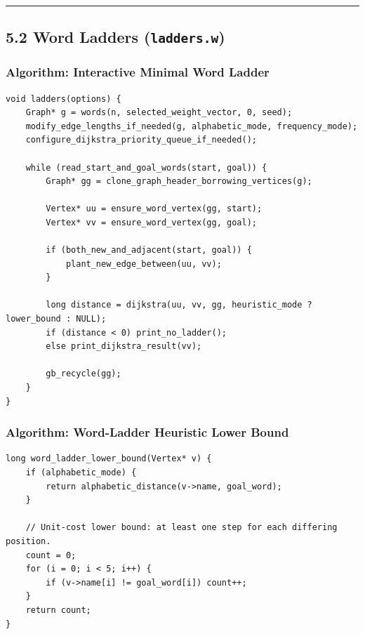 \documentclass[11pt]{article}
\begin{document}
\begin{center}\rule{0.5\linewidth}{0.5pt}\end{center}

\subsection{\texorpdfstring{5.2 Word Ladders (\texttt{ladders.w})}{5.2 Word Ladders (ladders.w)}}\label{word-ladders-ladders.w}

\subsubsection{Algorithm: Interactive Minimal Word Ladder}\label{algorithm-interactive-minimal-word-ladder}

\begin{verbatim}
void ladders(options) {
    Graph* g = words(n, selected_weight_vector, 0, seed);
    modify_edge_lengths_if_needed(g, alphabetic_mode, frequency_mode);
    configure_dijkstra_priority_queue_if_needed();

    while (read_start_and_goal_words(start, goal)) {
        Graph* gg = clone_graph_header_borrowing_vertices(g);

        Vertex* uu = ensure_word_vertex(gg, start);
        Vertex* vv = ensure_word_vertex(gg, goal);

        if (both_new_and_adjacent(start, goal)) {
            plant_new_edge_between(uu, vv);
        }

        long distance = dijkstra(uu, vv, gg, heuristic_mode ? lower_bound : NULL);
        if (distance < 0) print_no_ladder();
        else print_dijkstra_result(vv);

        gb_recycle(gg);
    }
}
\end{verbatim}

\subsubsection{Algorithm: Word-Ladder Heuristic Lower Bound}\label{algorithm-word-ladder-heuristic-lower-bound}

\begin{verbatim}
long word_ladder_lower_bound(Vertex* v) {
    if (alphabetic_mode) {
        return alphabetic_distance(v->name, goal_word);
    }

    // Unit-cost lower bound: at least one step for each differing position.
    count = 0;
    for (i = 0; i < 5; i++) {
        if (v->name[i] != goal_word[i]) count++;
    }
    return count;
}
\end{verbatim}
\end{document}

